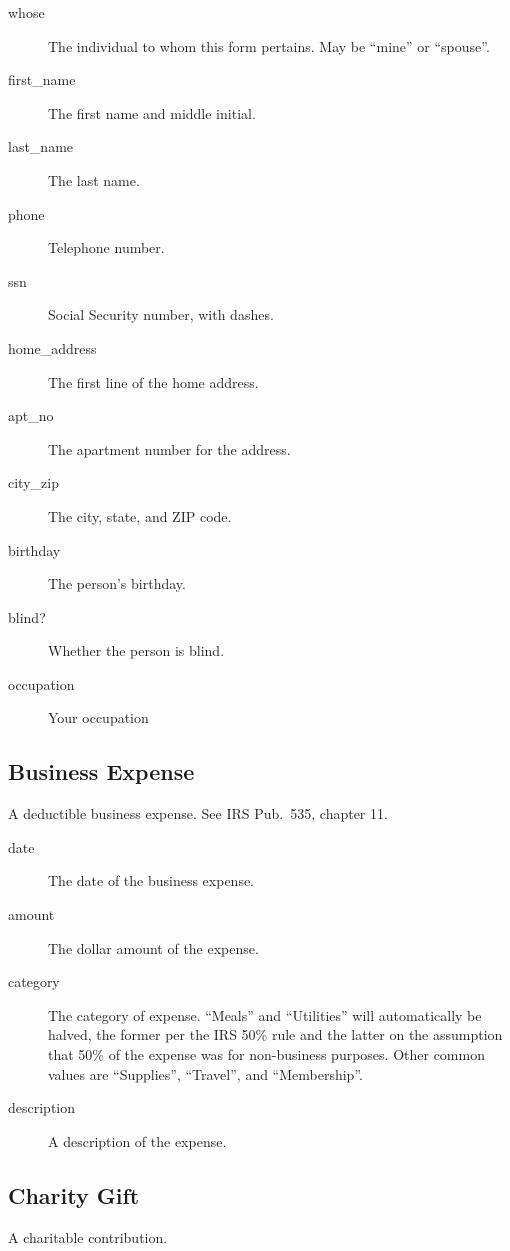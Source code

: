 \begin{description}
\item[whose] The individual to whom this form pertains. May be ``mine'' or
``spouse''.
\item[first\_name] The first name and middle initial.
\item[last\_name] The last name.
\item[phone] Telephone number.
\item[ssn] Social Security number, with dashes.
\item[home\_address] The first line of the home address.
\item[apt\_no] The apartment number for the address.
\item[city\_zip] The city, state, and ZIP code.
\item[birthday] The person's birthday.
\item[blind?] Whether the person is blind.
\item[occupation] Your occupation
\end{description}

\subsection{Business Expense}

A deductible business expense. See IRS Pub.~535, chapter 11.

\begin{description}
\item[date] The date of the business expense.
\item[amount] The dollar amount of the expense.
\item[category] The category of expense. ``Meals'' and ``Utilities'' will
automatically be halved, the former per the IRS 50\% rule and the latter on the
assumption that 50\% of the expense was for non-business purposes. Other common
values are ``Supplies'', ``Travel'', and ``Membership''.
\item[description] A description of the expense.
\end{description}


\subsection{Charity Gift}

A charitable contribution.

